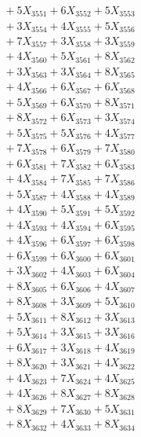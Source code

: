 \documentclass[a4paper,10pt]{article}
\begin{document}
{\begin{align}
&\;  + 5 X_{3551} + 6 X_{3552} + 5 X_{3553} \\[0.3ex]
&\;  + 3 X_{3554} + 4 X_{3555} + 5 X_{3556} \\[0.3ex]
&\;  + 7 X_{3557} + 3 X_{3558} + 3 X_{3559} \\[0.3ex]
&\;  + 4 X_{3560} + 5 X_{3561} + 8 X_{3562} \\[0.3ex]
&\;  + 3 X_{3563} + 3 X_{3564} + 8 X_{3565} \\[0.3ex]
&\;  + 4 X_{3566} + 6 X_{3567} + 6 X_{3568} \\[0.3ex]
&\;  + 5 X_{3569} + 6 X_{3570} + 8 X_{3571} \\[0.3ex]
&\;  + 8 X_{3572} + 6 X_{3573} + 3 X_{3574} \\[0.3ex]
&\;  + 5 X_{3575} + 5 X_{3576} + 4 X_{3577} \\[0.3ex]
&\;  + 7 X_{3578} + 6 X_{3579} + 7 X_{3580} \\[0.5ex]\allowbreak
&\;  + 6 X_{3581} + 7 X_{3582} + 6 X_{3583} \\[0.3ex]
&\;  + 4 X_{3584} + 7 X_{3585} + 7 X_{3586} \\[0.3ex]
&\;  + 5 X_{3587} + 4 X_{3588} + 4 X_{3589} \\[0.3ex]
&\;  + 4 X_{3590} + 5 X_{3591} + 5 X_{3592} \\[0.3ex]
&\;  + 4 X_{3593} + 4 X_{3594} + 6 X_{3595} \\[0.3ex]
&\;  + 4 X_{3596} + 6 X_{3597} + 6 X_{3598} \\[0.3ex]
&\;  + 6 X_{3599} + 6 X_{3600} + 6 X_{3601} \\[0.3ex]
&\;  + 3 X_{3602} + 4 X_{3603} + 6 X_{3604} \\[0.3ex]
&\;  + 8 X_{3605} + 6 X_{3606} + 4 X_{3607} \\[0.3ex]
&\;  + 8 X_{3608} + 3 X_{3609} + 5 X_{3610} \\[0.5ex]\allowbreak
&\;  + 5 X_{3611} + 8 X_{3612} + 3 X_{3613} \\[0.3ex]
&\;  + 5 X_{3614} + 3 X_{3615} + 3 X_{3616} \\[0.3ex]
&\;  + 6 X_{3617} + 3 X_{3618} + 4 X_{3619} \\[0.3ex]
&\;  + 8 X_{3620} + 3 X_{3621} + 4 X_{3622} \\[0.3ex]
&\;  + 4 X_{3623} + 7 X_{3624} + 4 X_{3625} \\[0.3ex]
&\;  + 4 X_{3626} + 8 X_{3627} + 8 X_{3628} \\[0.3ex]
&\;  + 8 X_{3629} + 7 X_{3630} + 5 X_{3631} \\[0.3ex]
&\;  + 8 X_{3632} + 4 X_{3633} + 8 X_{3634} \\[0.3ex]

\end{align}}
\end{document}
